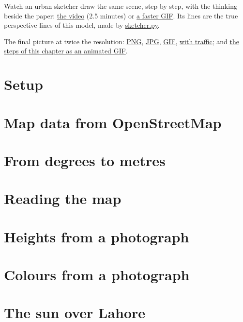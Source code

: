 Watch an urban sketcher draw the same scene, step by step, with the thinking beside the paper: \href{https://ahmadammar.github.io/files/pixel-animation/sketcher.mp4}{the video} (2.5 minutes) or \href{https://ahmadammar.github.io/files/pixel-animation/sketcher_preview.gif}{a faster GIF}. Its lines are the true perspective lines of this model, made by \href{https://github.com/AhmadAmmar/pixel-lahore/blob/master/python/sketcher.py}{sketcher.py}.

The final picture at twice the resolution: \href{https://ahmadammar.github.io/files/pixel-animation/tollinton_final.png}{PNG}, \href{https://ahmadammar.github.io/files/pixel-animation/tollinton_final.jpg}{JPG}, \href{https://ahmadammar.github.io/files/pixel-animation/tollinton_final.gif}{GIF}, \href{https://ahmadammar.github.io/files/pixel-animation/tollinton_traffic_detailed.gif}{with traffic}; and \href{https://ahmadammar.github.io/files/pixel-animation/tollinton_steps.gif}{the steps of this chapter as an animated GIF}.

\section{Setup}

\section{Map data from OpenStreetMap}

\section{From degrees to metres}

\section{Reading the map}

\section{Heights from a photograph}

\section{Colours from a photograph}

\section{The sun over Lahore}

